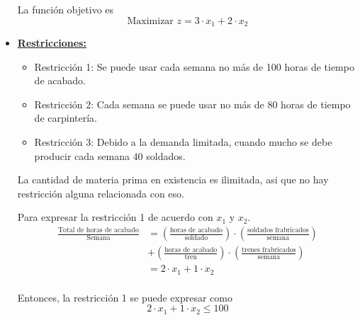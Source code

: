 \documentclass[../main.tex]{subfiles}
\begin{document}
\begin{example}
\begin{itemize}
                La función objetivo es
                \begin{equation}
                        \text{Maximizar } z =  3 \cdot x_1 + 2 \cdot x_2
                \end{equation}

            \item \textbf{\underline{Restricciones:}}
                \begin{itemize}
                    \item Restricción 1: Se puede usar cada semana no más de 100 horas de tiempo de acabado.
                    \item Restricción 2: Cada semana se puede usar no más de 80 horas de tiempo de carpintería.
                    \item Restricción 3: Debido a la demanda limitada, cuando mucho se debe producir cada semana 40 soldados.
                \end{itemize}

                La cantidad de materia prima en existencia es ilimitada, asi que no hay restricción alguna relacionada con eso.

                Para expresar la restricción 1 de acuerdo con $x_1$ y $x_2$.
                \begin{equation}
                    \begin{split}
                        \frac{\text{Total de horas de acabado}}{\text{Semana}} &= \left(\frac{\text{horas de acabado}}{\text{soldado}}\right) \cdot \left(\frac{\text{soldados frabricados}}{\text{semana}}\right) \\ & + \left(\frac{\text{horas de acabado}}{\text{tren}}\right) \cdot \left(\frac{\text{trenes frabricados}}{\text{semana}}\right)  \\
                        &= 2 \cdot x_1 + 1 \cdot x_2 \\
                    \end{split}
                \end{equation}

                Entonces, la restricción 1 se puede expresar como
                \begin{equation}
                    2 \cdot x_1 + 1 \cdot x_2 \leq 100
                \end{equation}


\end{itemize}
\end{example}
\end{document}
